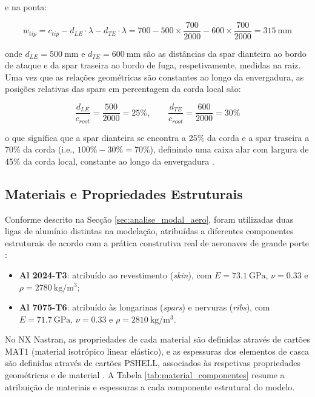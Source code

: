 \documentclass[a4paper,fleqn]{cas-sc}
\begin{document}
\noindent e na ponta:

\begin{equation}
    w_{tip} = c_{tip} - d_{LE} \cdot \lambda - d_{TE} \cdot \lambda 
    = 700 - 500\times\frac{700}{2000} - 600\times\frac{700}{2000} 
    = \SI{315}{\milli\meter}
    \label{eq:largura_caixa_ponta}
\end{equation}

\noindent onde $d_{LE} = \SI{500}{\milli\meter}$ e $d_{TE} = \SI{600}{\milli\meter}$ são as distâncias da spar dianteira ao bordo de ataque e da spar traseira ao bordo de fuga, respetivamente, medidas na raiz. Uma vez que as relações geométricas são constantes ao longo da envergadura, as posições relativas das spars em percentagem da corda local são:

\begin{equation}
    \frac{d_{LE}}{c_{root}} = \frac{500}{2000} = 25\%, \qquad
    \frac{d_{TE}}{c_{root}} = \frac{600}{2000} = 30\%
    \label{eq:posicao_spars}
\end{equation}

\noindent o que significa que a spar dianteira se encontra a 25\% da corda e a spar traseira a 70\% da corda (i.e., $100\% - 30\% = 70\%$), definindo uma caixa alar com largura de 45\% da corda local, constante ao longo da envergadura \cite{Niu1988}.

\subsection{Materiais e Propriedades Estruturais}

Conforme descrito na Secção \ref{sec:analise_modal_aero}, foram utilizadas duas ligas de alumínio distintas na modelação, atribuídas a diferentes componentes estruturais de acordo com a prática construtiva real de aeronaves de grande porte \cite{Megson2012}:

\begin{itemize}
    \item \textbf{Al 2024-T3}: atribuído ao revestimento 
    (\textit{skin}), com $E = \SI{73.1}{\giga\pascal}$, 
    $\nu = 0.33$ e $\rho = \SI{2780}{\kilo\gram\per\cubic\meter}$;
    \item \textbf{Al 7075-T6}: atribuído às longarinas 
    (\textit{spars}) e nervuras (\textit{ribs}), com 
    $E = \SI{71.7}{\giga\pascal}$, $\nu = 0.33$ e 
    $\rho = \SI{2810}{\kilo\gram\per\cubic\meter}$.
\end{itemize}

No NX Nastran, as propriedades de cada material são definidas através de cartões MAT1 (material isotrópico linear elástico), e as espessuras dos elementos de casca são definidas através de cartões PSHELL, associados às respetivas propriedades geométricas e de material \cite{Nastran2014}. A Tabela \ref{tab:material_componentes} resume a atribuição de materiais e espessuras a cada componente estrutural do modelo.
\end{document}
